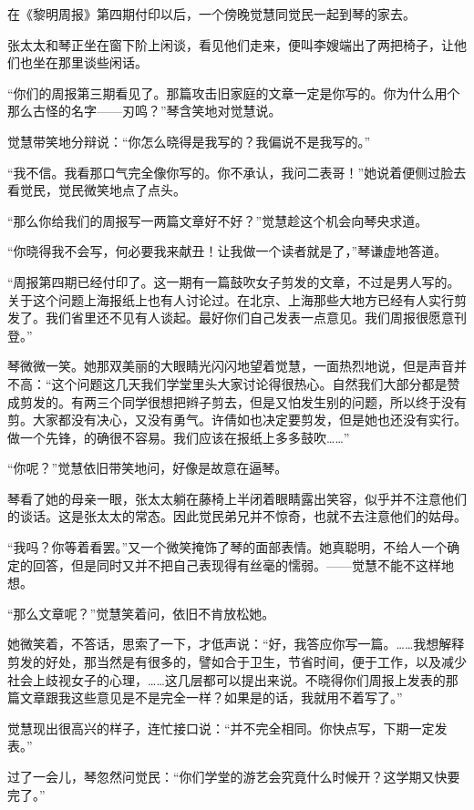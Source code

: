 \par 在《黎明周报》第四期付印以后，一个傍晚觉慧同觉民一起到琴的家去。
\par 张太太和琴正坐在窗下阶上闲谈，看见他们走来，便叫李嫂端出了两把椅子，让他们也坐在那里谈些闲话。
\par “你们的周报第三期看见了。那篇攻击旧家庭的文章一定是你写的。你为什么用个那么古怪的名字——刃鸣？”琴含笑地对觉慧说。
\par 觉慧带笑地分辩说：“你怎么晓得是我写的？我偏说不是我写的。”
\par “我不信。我看那口气完全像你写的。你不承认，我问二表哥！”她说着便侧过脸去看觉民，觉民微笑地点了点头。
\par “那么你给我们的周报写一两篇文章好不好？”觉慧趁这个机会向琴央求道。
\par “你晓得我不会写，何必要我来献丑！让我做一个读者就是了，”琴谦虚地答道。
\par “周报第四期已经付印了。这一期有一篇鼓吹女子剪发的文章，不过是男人写的。关于这个问题上海报纸上也有人讨论过。在北京、上海那些大地方已经有人实行剪发了。我们省里还不见有人谈起。最好你们自己发表一点意见。我们周报很愿意刊登。”
\par 琴微微一笑。她那双美丽的大眼睛光闪闪地望着觉慧，一面热烈地说，但是声音并不高：“这个问题这几天我们学堂里头大家讨论得很热心。自然我们大部分都是赞成剪发的。有两三个同学很想把辫子剪去，但是又怕发生别的问题，所以终于没有剪。大家都没有决心，又没有勇气。许倩如也决定要剪发，但是她也还没有实行。做一个先锋，的确很不容易。我们应该在报纸上多多鼓吹……”
\par “你呢？”觉慧依旧带笑地问，好像是故意在逼琴。
\par 琴看了她的母亲一眼，张太太躺在藤椅上半闭着眼睛露出笑容，似乎并不注意他们的谈话。这是张太太的常态。因此觉民弟兄并不惊奇，也就不去注意他们的姑母。
\par “我吗？你等着看罢。”又一个微笑掩饰了琴的面部表情。她真聪明，不给人一个确定的回答，但是同时又并不把自己表现得有丝毫的懦弱。——觉慧不能不这样地想。
\par “那么文章呢？”觉慧笑着问，依旧不肯放松她。
\par 她微笑着，不答话，思索了一下，才低声说：“好，我答应你写一篇。……我想解释剪发的好处，那当然是有很多的，譬如合于卫生，节省时间，便于工作，以及减少社会上歧视女子的心理，……这几层都可以提出来说。不晓得你们周报上发表的那篇文章跟我这些意见是不是完全一样？如果是的话，我就用不着写了。”
\par 觉慧现出很高兴的样子，连忙接口说：“并不完全相同。你快点写，下期一定发表。”
\par 过了一会儿，琴忽然问觉民：“你们学堂的游艺会究竟什么时候开？这学期又快要完了。”

